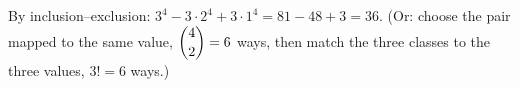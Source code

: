 By inclusion--exclusion: $3^4-3\cdot2^4+3\cdot1^4=81-48+3=\boxed{36}$. (Or: choose the pair mapped to the same value, $\dbinom42=6$ ways, then match the three classes to the three values, $3!=6$ ways.)
